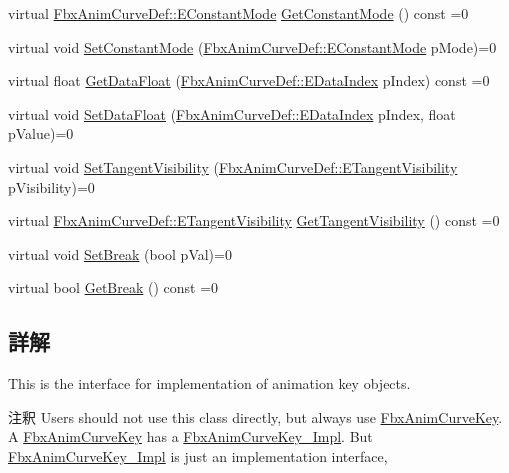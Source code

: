 \begin{DoxyCompactItemize}
\item 
virtual \hyperlink{class_fbx_anim_curve_def_a52885abd392ac8ac3da94bafc5fddd64}{Fbx\+Anim\+Curve\+Def\+::\+E\+Constant\+Mode} \hyperlink{class_fbx_anim_curve_key___impl_a4bc0a9e316a26cda8eb93650cdd69cc6}{Get\+Constant\+Mode} () const =0
\item 
virtual void \hyperlink{class_fbx_anim_curve_key___impl_acdda5216487f7d9c0227a6d84bf9682c}{Set\+Constant\+Mode} (\hyperlink{class_fbx_anim_curve_def_a52885abd392ac8ac3da94bafc5fddd64}{Fbx\+Anim\+Curve\+Def\+::\+E\+Constant\+Mode} p\+Mode)=0
\item 
virtual float \hyperlink{class_fbx_anim_curve_key___impl_aac62e8ec0866fb13117b152b09bda0f6}{Get\+Data\+Float} (\hyperlink{class_fbx_anim_curve_def_a3be261d961f8226235529b148cf80300}{Fbx\+Anim\+Curve\+Def\+::\+E\+Data\+Index} p\+Index) const =0
\item 
virtual void \hyperlink{class_fbx_anim_curve_key___impl_ac4cbe2f9caddb5a80fa009349c3ef059}{Set\+Data\+Float} (\hyperlink{class_fbx_anim_curve_def_a3be261d961f8226235529b148cf80300}{Fbx\+Anim\+Curve\+Def\+::\+E\+Data\+Index} p\+Index, float p\+Value)=0
\item 
virtual void \hyperlink{class_fbx_anim_curve_key___impl_a270f41a6f9808da3d6feb21bce1ca7d6}{Set\+Tangent\+Visibility} (\hyperlink{class_fbx_anim_curve_def_a70c49072776ac6b3426c57dd80e16e3b}{Fbx\+Anim\+Curve\+Def\+::\+E\+Tangent\+Visibility} p\+Visibility)=0
\item 
virtual \hyperlink{class_fbx_anim_curve_def_a70c49072776ac6b3426c57dd80e16e3b}{Fbx\+Anim\+Curve\+Def\+::\+E\+Tangent\+Visibility} \hyperlink{class_fbx_anim_curve_key___impl_afc01debb2c6e0130c80640c201578c3e}{Get\+Tangent\+Visibility} () const =0
\item 
virtual void \hyperlink{class_fbx_anim_curve_key___impl_ae03e1fe4dd15e95d9ebfc1ef3d61373e}{Set\+Break} (bool p\+Val)=0
\item 
virtual bool \hyperlink{class_fbx_anim_curve_key___impl_abc2196ef771b4da6acb0b36fa906277c}{Get\+Break} () const =0
\end{DoxyCompactItemize}


\subsection{詳解}
This is the interface for implementation of animation key objects.

\begin{DoxyRemark}{注釈}
Users should not use this class directly, but always use \hyperlink{class_fbx_anim_curve_key}{Fbx\+Anim\+Curve\+Key}. A \hyperlink{class_fbx_anim_curve_key}{Fbx\+Anim\+Curve\+Key} has a \hyperlink{class_fbx_anim_curve_key___impl}{Fbx\+Anim\+Curve\+Key\+\_\+\+Impl}. But \hyperlink{class_fbx_anim_curve_key___impl}{Fbx\+Anim\+Curve\+Key\+\_\+\+Impl} is just an implementation interface, 
\end{DoxyRemark}


